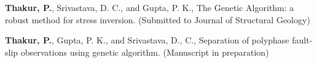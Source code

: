 {
\setlength{\parindent}{0cm}

\textbf{Thakur, P.}, Srivastava, D. C., and Gupta, P. K., The Genetic Algorithm: a robust method for stress inversion. (Submitted to Journal of Structural Geology) 

\textbf{Thakur, P.}, Gupta, P. K., and Srivastava, D., C., Separation of polyphase fault-slip observations using genetic algorithm. (Manuscript in preparation)
}